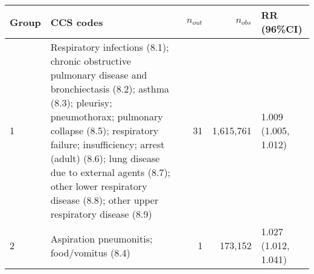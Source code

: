 \begin{tabular}{lp{6.5cm}rrp{2.2cm}}
  \hline
Group & CCS codes & $n_{out}$ & $n_{obs}$ & RR (96\%CI) \\ 
  \hline
   1 & Respiratory infections (8.1); chronic obstructive pulmonary disease and bronchiectasis (8.2); asthma (8.3); pleurisy; pneumothorax; pulmonary collapse (8.5); respiratory failure; insufficiency; arrest (adult) (8.6); lung disease due to external agents (8.7); other lower respiratory disease (8.8); other upper respiratory disease (8.9) &   31 & 1,615,761 & 1.009 (1.005, 1.012) \\ 
     2 & Aspiration pneumonitis; food/vomitus (8.4) &    1 & 173,152 & 1.027 (1.012, 1.041) \\ 
   \hline
\end{tabular}

